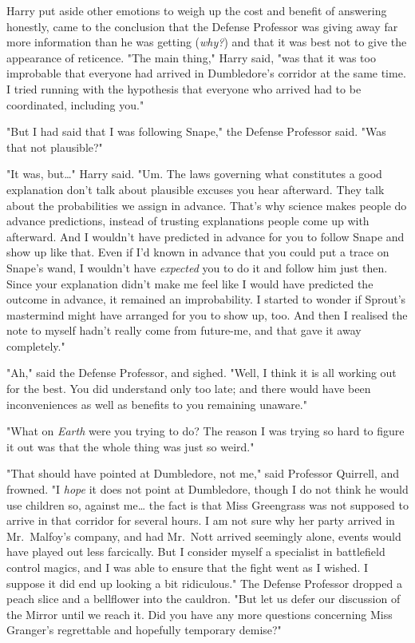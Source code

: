 Harry put aside other emotions to weigh up the cost and benefit of answering 
honestly, came to the conclusion that the Defense Professor was giving away far 
more information than he was getting (\emph{why?}) and that it was best not to 
give the appearance of reticence. "The main thing," Harry said, "was that it 
was too improbable that everyone had arrived in Dumbledore's corridor at the 
same time. I tried running with the hypothesis that everyone who arrived had to 
be coordinated, including you."

"But I had said that I was following Snape," the Defense Professor said. "Was 
that not plausible?"

"It was, but{\ldots}" Harry said. "Um. The laws governing what constitutes a 
good explanation don't talk about plausible excuses you hear afterward. They 
talk about the probabilities we assign in advance. That's why science makes 
people do advance predictions, instead of trusting explanations people come up 
with afterward. And I wouldn't have predicted in advance for you to follow 
Snape and show up like that. Even if I'd known in advance that you could put a 
trace on Snape's wand, I wouldn't have \emph{expected} you to do it and follow 
him just then. Since your explanation didn't make me feel like I would have 
predicted the outcome in advance, it remained an improbability. I started to 
wonder if Sprout's mastermind might have arranged for you to show up, too. And 
then I realised the note to myself hadn't really come from future-me, and that 
gave it away completely."

"Ah," said the Defense Professor, and sighed. "Well, I think it is all working 
out for the best. You did understand only too late; and there would have been 
inconveniences as well as benefits to you remaining unaware."

"What on \emph{Earth} were you trying to do? The reason I was trying so hard to 
figure it out was that the whole thing was just so weird."

"That should have pointed at Dumbledore, not me," said Professor Quirrell, and 
frowned. "I \emph{hope} it does not point at Dumbledore, though I do not think 
he would use children so, against me{\ldots} the fact is that Miss Greengrass 
was not supposed to arrive in that corridor for several hours. I am not sure 
why her party arrived in Mr.~Malfoy's company, and had Mr.~Nott arrived 
seemingly alone, events would have played out less farcically. But I consider 
myself a specialist in battlefield control magics, and I was able to ensure 
that the fight went as I wished. I suppose it did end up looking a bit 
ridiculous." The Defense Professor dropped a peach slice and a bellflower into 
the cauldron. "But let us defer our discussion of the Mirror until we reach it. 
Did you have any more questions concerning Miss Granger's regrettable and 
hopefully temporary demise?"

